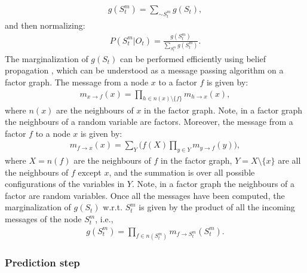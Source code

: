 \documentclass[twoside,11pt]{article}
\begin{document}
\begin{align*}
g(S_t^m) = \sum_{\sim S^m_t} g(S_t),
\end{align*}
and then normalizing:
\begin{align*}
P(S_t^m|O_t) = \frac{g(S_t^m)}{\sum_{S^m_t} g(S^m_t)}.
\end{align*}
The marginalization of $g(S_t)$ can be performed efficiently using belief propagation \citep{belief_propagation}, which can be understood as a message passing algorithm on a factor graph. The message from a node $x$ to a factor $f$ is given by:
\begin{align*}
m_{x \rightarrow f}(x) = \prod_{h \in n(x) \setminus \{f\}} m_{h \rightarrow x}(x),
\end{align*}
where $n(x)$ are the neighbours of $x$ in the factor graph. Note, in a factor graph the neighbours of a random variable are factors. Moreover, the message from a factor $f$ to a node $x$ is given by:
\begin{align*}
m_{f \rightarrow x}(x) = \sum_{Y} \Bigg( f(X) \prod_{y \in Y} m_{y \rightarrow f}(y)\Bigg),
\end{align*}
where $X = n(f)$ are the neighbours of $f$ in the factor graph, $Y = X \setminus \{x\}$ are all the neighbours of $f$ except $x$, and the summation is over all possible configurations of the variables in $Y$. Note, in a factor graph the neighbours of a factor are random variables. Once all the messages have been computed, the marginalization of $g(S_t)$ w.r.t. $S_t^m$ is given by the product of all the incoming messages of the node $S_t^m$, i.e.,
\begin{align*}
g(S_t^m) = \prod_{f \in n(S_t^m)} m_{f \rightarrow S_t^m}(S_t^m).
\end{align*}

\subsubsection{Prediction step} \label{ssec:p_step}
\end{document}
